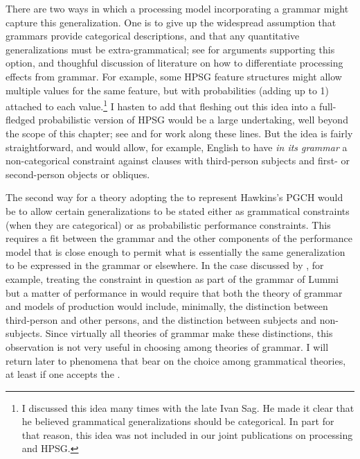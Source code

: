 \documentclass[output=paper
                ,modfonts
                ,nonflat
	        ,collection
	        ,collectionchapter
	        ,collectiontoclongg
 	        ,biblatex
                ,babelshorthands
                ,newtxmath
                ,draftmode
                ,colorlinks, citecolor=brown
]{./langsci/langscibook}
\begin{document}
There are two ways in which a processing model incorporating a grammar might capture this generalization.  One is to give up the widespread assumption that grammars provide categorical descriptions, and that any quantitative generalizations must be extra-grammatical; see \citet{FrancisPrep-b} for arguments supporting this option, and thoughful discussion of literature on how to differentiate processing effects from grammar.  For example, some HPSG feature structures might allow multiple values for the same feature, but with probabilities (adding up to 1) attached to each value.\footnote{I discussed this idea many times with the late Ivan Sag.  He made it clear that he believed grammatical generalizations should be categorical.  In part for that reason, this idea was not included in our joint publications on processing and HPSG.}  I hasten to add that fleshing out this idea into a full-fledged probabilistic version of HPSG would be a large undertaking, well beyond the scope of this chapter; see \citet{Linadarki2006} and \citet{MT2008a-u} for work along these lines.  But the idea is fairly straightforward, and would allow, for example, English to have \emph{in its grammar} a non-categorical constraint against clauses with third-person subjects and first- or second-person objects or obliques.  

The second way for a theory adopting the  to represent Hawkins's PGCH would be to allow certain generalizations to be stated either as grammatical constraints (when they are categorical) or as probabilistic performance constraints.  This requires a fit between the grammar and the other components of the performance model that is close enough to permit what is essentially the same generalization to be expressed in the grammar or elsewhere.  In the case discussed by \citeauthor{BresnanEtAl2001}, for example, treating the constraint in question as part of the grammar of Lummi but a matter of performance in  would require that both the theory of grammar and models of production would include, minimally, the distinction between third-person and other persons, and the distinction between subjects and non-subjects.  Since virtually all theories of grammar make these distinctions, this observation is not very useful in choosing among theories of grammar.  I will return later to phenomena that bear on the choice among grammatical theories, at least if one accepts the .
\end{document}
